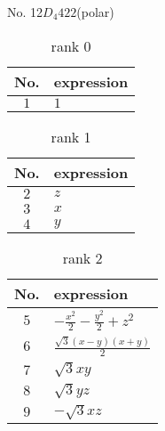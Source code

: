\documentclass[fleqn,8pt,landscape]{jsarticle}
\begin{document}
\setcounter{MaxMatrixCols}{16}

\begin{center}
\LARGE
No. 12\quad$D_{4}$\quad$422$\quad[ tetragonal ] (polar)
\end{center}
\begin{table}[ht!]
\begin{center}
\caption{rank 0}
\renewcommand{\arraystretch}{1.3}
\begin{tabular}{cl} \hline \hline
No. & expression \\ \hline
$ 1 $ & $ 1 $ \\
 \hline \hline
\end{tabular}
\end{center}
\end{table}
\begin{table}[ht!]
\begin{center}
\caption{rank 1}
\renewcommand{\arraystretch}{1.3}
\begin{tabular}{cl} \hline \hline
No. & expression \\ \hline
$ 2 $ & $ z $ \\
$ 3 $ & $ x $ \\
$ 4 $ & $ y $ \\
 \hline \hline
\end{tabular}
\end{center}
\end{table}
\begin{table}[ht!]
\begin{center}
\caption{rank 2}
\renewcommand{\arraystretch}{1.3}
\begin{tabular}{cl} \hline \hline
No. & expression \\ \hline
$ 5 $ & $ - \frac{x^{2}}{2} - \frac{y^{2}}{2} + z^{2} $ \\
$ 6 $ & $ \frac{\sqrt{3} \left(x - y\right) \left(x + y\right)}{2} $ \\
$ 7 $ & $ \sqrt{3} x y $ \\
$ 8 $ & $ \sqrt{3} y z $ \\
$ 9 $ & $ - \sqrt{3} x z $ \\
 \hline \hline
\end{tabular}
\end{center}
\end{table}
\end{document}
